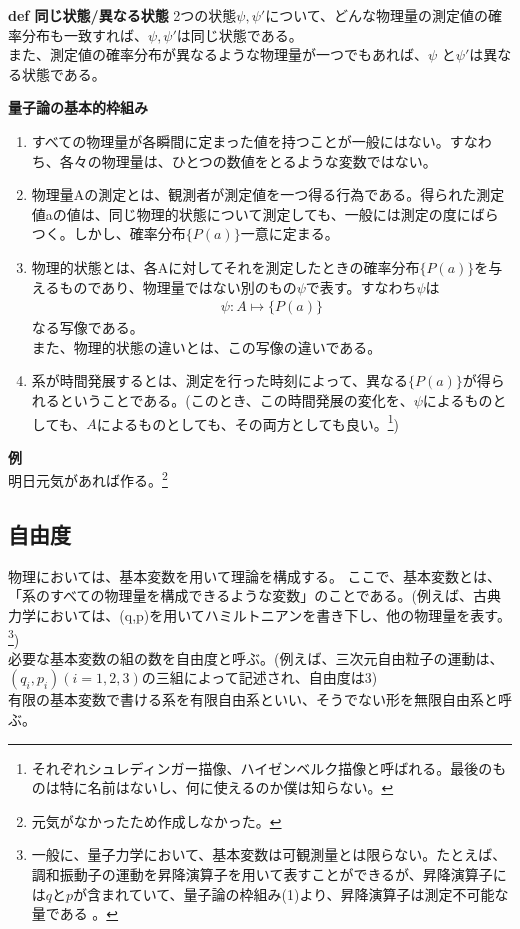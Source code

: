 \documentclass[a4paper,11pt]{jsarticle}
\begin{document}
\begin{itembox}[l]{\textbf {def 同じ状態/異なる状態}}
  2つの状態$\psi ,\psi '$について、どんな物理量の測定値の確率分布も一致すれば、$\psi ,\psi '$は同じ状態である。\\
  また、測定値の確率分布が異なるような物理量が一つでもあれば、$\psi$ と$\psi '$は異なる状態である。\\
  \end{itembox}
  
\begin{itembox}[l]{\textbf{量子論の基本的枠組み}}
  \begin{enumerate}
    \item すべての物理量が各瞬間に定まった値を持つことが一般にはない。すなわち、各々の物理量は、ひとつの数値をとるような変数ではない。
    \item 物理量Aの測定とは、観測者が測定値を一つ得る行為である。得られた測定値aの値は、同じ物理的状態について測定しても、一般には測定の度にばらつく。しかし、確率分布$\{P(a)\}$一意に定まる。
\item 物理的状態とは、各Aに対してそれを測定したときの確率分布$\{P(a)\}$を与えるものであり、物理量ではない別のもの$\psi$で表す。すなわち$\psi$は
\begin{align}
\psi : A \mapsto \{P(a)\}
\end{align}
なる写像である。\\
また、物理的状態の違いとは、この写像の違いである。
\item 系が時間発展するとは、測定を行った時刻によって、異なる$\{P(a)\}$が得られるということである。(このとき、この時間発展の変化を、$\psi$によるものとしても、$A$によるものとしても、その両方としても良い。\footnote{それぞれシュレディンガー描像、ハイゼンベルク描像と呼ばれる。最後のものは特に名前はないし、何に使えるのか僕は知らない。})
  \end{enumerate}
\end{itembox}

\textbf{例}\\
明日元気があれば作る。\footnote{元気がなかったため作成しなかった。}

\newpage

\subsection{自由度}
物理においては、基本変数を用いて理論を構成する。
ここで、基本変数とは、「系のすべての物理量を構成できるような変数」のことである。(例えば、古典力学においては、(q,p)を用いてハミルトニアンを書き下し、他の物理量を表す。\footnote{一般に、量子力学において、基本変数は可観測量とは限らない。たとえば、調和振動子の運動を昇降演算子を用いて表すことができるが、昇降演算子には$q$と$p$が含まれていて、量子論の枠組み(1)より、昇降演算子は測定不可能な量である
。})\\
必要な基本変数の組の数を自由度と呼ぶ。(例えば、三次元自由粒子の運動は、$(q_i,p_i)(i=1,2,3)$の三組によって記述され、自由度は3)\\
有限の基本変数で書ける系を有限自由系といい、そうでない形を無限自由系と呼ぶ。\\
\end{document}
